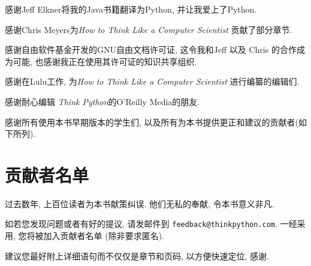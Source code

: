 \documentclass[10pt]{book}
\begin{document}
感谢Jeff Elkner将我的Java书籍翻译为Python, 
并让我爱上了Python.

感谢Chris Meyers为{\em How to Think Like a Computer Scientist}
贡献了部分章节. 


感谢自由软件基金开发的GNU自由文档许可证, 
这令我和Jeff 以及 Chris 的合作成为可能,
也感谢我正在使用其许可证的知识共享组织. 


感谢在Lulu工作, 为{\em How to Think Like a Computer Scientist}
进行编纂的编辑们. 

感谢耐心编辑 {\em Think Python}的O'Reilly Media的朋友. 

感谢所有使用本书早期版本的学生们, 以及所有为本书提供更正和建议的贡献者(如下所列). 


\section*{贡献者名单}

过去数年, 上百位读者为本书献策纠误. 
他们无私的奉献, 令本书意义非凡. 

如若您发现问题或者有好的提议, 请发邮件到 
{\tt feedback@thinkpython.com}. 一经采用, 您将被加入贡献者名单
(除非要求匿名).

建议您最好附上详细语句而不仅仅是章节和页码, 以方便快速定位, 感谢. 
\end{document}
